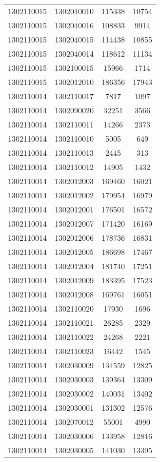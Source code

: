 \begin{longtable}{llcc}
1302110015 & 1302040010 & 115338 & 10754\\
1302110015 & 1302040016 & 108833 & 9914\\
1302110015 & 1302040015 & 114438 & 10855\\
1302110015 & 1302040014 & 118612 & 11134\\
1302110015 & 1302100015 & 15966 & 1714\\
1302110015 & 1302012010 & 186356 & 17943\\
1302110014 & 1302110017 & 7817 & 1097\\
1302110014 & 1302090020 & 32251 & 3566\\
1302110014 & 1302110011 & 14266 & 2373\\
1302110014 & 1302110010 & 5005 & 649\\
1302110014 & 1302110013 & 2445 & 313\\
1302110014 & 1302110012 & 14905 & 1432\\
1302110014 & 1302012003 & 169460 & 16021\\
1302110014 & 1302012002 & 179954 & 16979\\
1302110014 & 1302012001 & 176501 & 16572\\
1302110014 & 1302012007 & 171420 & 16169\\
1302110014 & 1302012006 & 178736 & 16831\\
1302110014 & 1302012005 & 186698 & 17467\\
1302110014 & 1302012004 & 181740 & 17251\\
1302110014 & 1302012009 & 183395 & 17523\\
1302110014 & 1302012008 & 169761 & 16051\\
1302110014 & 1302110020 & 17930 & 1696\\
1302110014 & 1302110021 & 26285 & 2329\\
1302110014 & 1302110022 & 24268 & 2221\\
1302110014 & 1302110023 & 16442 & 1545\\
1302110014 & 1302030009 & 134559 & 12825\\
1302110014 & 1302030003 & 139364 & 13309\\
1302110014 & 1302030002 & 140031 & 13402\\
1302110014 & 1302030001 & 131302 & 12576\\
1302110014 & 1302070012 & 55001 & 4990\\
1302110014 & 1302030006 & 133958 & 12816\\
1302110014 & 1302030005 & 141030 & 13395\\

\end{longtable}
